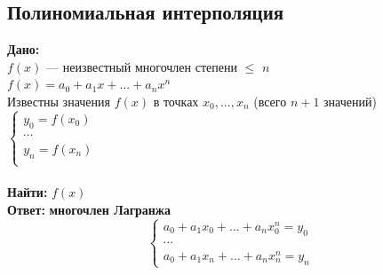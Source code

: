 \documentclass[12pt]{article}
\begin{document}
	\subsection{Полиномиальная интерполяция}
	\textbf{Дано:} \\$f(x)$ --- неизвестный многочлен степени $\leq$ $n$\\
	$f(x) = a_{0}+a_1x+...+a_nx^n$ \\
	Известны значения $f(x)$ в точках $x_0, ..., x_n$ (всего $n+1$ значений)\\ 
	$
	\left\{  
	\begin{array}{ccl}  
	y_0=f(x_0)\\
	\cdots\\
	y_n=f(x_n)\\  
	\end{array}   
	\right.  
	$
	\\
	\\ \textbf{Найти:} $f(x)$
	\\ \textbf{Ответ:} \textbf{многочлен Лагранжа} \\
	\begin{equation*}
	\begin{cases}
	a_0+a_1x_0+...+a_nx_0^n = y_0\\
	\cdots\\
	a_0+a_1x_n+...+a_nx_n^n = y_n
	\end{cases}
	\end{equation*}
	
\end{document}
